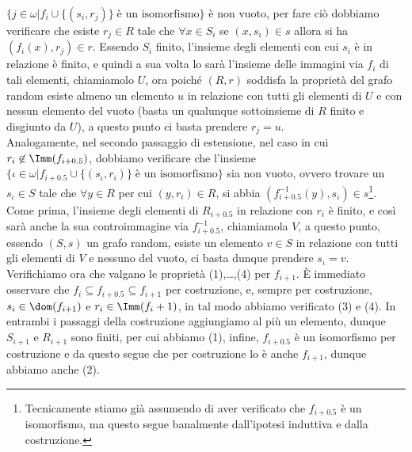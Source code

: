 \begin{soln}
\begin{itemize}
		$\{j \in \omega | f_{i} \cup \{(s_i,r_j)\} \; \text{è un isomorfismo}\}$ è non vuoto, per fare ciò dobbiamo verificare che esiste $r_j \in R$ tale che $\forall x \in S_i$ se $(x,s_i) \in s$ allora si ha $(f_i(x),r_j) \in r$.
		Essendo $S_i$ finito, l'insieme degli elementi con cui $s_i$ è in relazione è finito, e quindi a sua volta lo sarà l'insieme delle immagini via $f_i$ di tali elementi, chiamiamolo $U$, ora poiché $(R,r)$ soddisfa la proprietà 
		del grafo random esiste almeno un elemento $u$ in relazione con tutti gli elementi di $U$ e con nessun elemento del vuoto (basta un qualunque sottoinsieme di $R$ finito e disgiunto da $U$), a questo punto ci basta prendere $r_j = u$.\\
		Analogamente, nel secondo passaggio di estensione, nel caso in cui $r_i \not \in \Imm(f_{i+0.5})$, dobbiamo verificare che l'insieme $\{\iota \in \omega | f_{i + 0.5} \cup \{(s_\iota,r_i)\} \; \text{è un isomorfismo}\}$ sia non vuoto, ovvero trovare un $s_\iota \in S$ tale che $\forall y \in R$
		per cui $(y,r_i) \in R$, si abbia $(f_{i+0.5}^{-1}(y),s_\iota) \in s$\footnote{Tecnicamente stiamo già assumendo di aver verificato che $f_{i + 0.5}$ è un isomorfismo, ma questo segue banalmente dall'ipotesi induttiva e dalla costruzione.}.
		Come prima, l'insieme degli elementi di $R_{i + 0.5}$ in relazione con $r_i$ è finito, e così sarà anche la sua controimmagine via $f_{i + 0.5}^{-1}$, chiamiamola $V$, a questo punto, essendo $(S,s)$ un grafo random,
		esiste un elemento $v \in S$ in relazione con tutti gli elementi di $V$ e nessuno del vuoto, ci basta dunque prendere $s_\iota = v$.\\
		Verifichiamo ora che valgano le proprietà (1),\ldots,(4) per $f_{i+1}$. È immediato osservare che $f_i \subseteq f_{i + 0.5} \subseteq f_{i + 1}$ per costruzione, e, sempre per costruzione, $s_i \in \dom(f_{i+1})$ e $r_i \in \Imm(f_i + 1)$, in tal modo abbiamo verificato (3) e (4).
		In entrambi i passaggi della costruzione aggiungiamo al più un elemento, dunque $S_{i+1}$ e $R_{i + 1}$ sono finiti, per cui abbiamo (1), infine, $f_{i+0.5}$ è un isomorfismo per costruzione e da questo segue che per costruzione lo è anche $f_{i+1}$, dunque abbiamo anche (2).
	\end{itemize}
\end{soln}